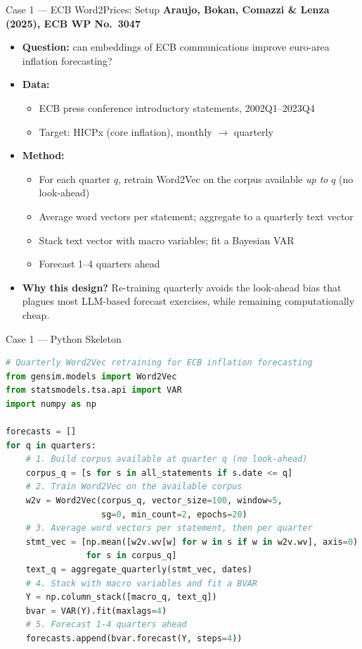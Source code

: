\documentclass[10pt,english,aspectratio=169]{beamer}
\begin{document}
\begin{frame}{Case 1 --- ECB Word2Prices: Setup}
\textbf{Araujo, Bokan, Comazzi \& Lenza (2025), ECB WP No.\ 3047}

\medskip
\begin{itemize}
\item \textbf{Question:} can embeddings of ECB communications improve euro-area inflation forecasting?

\medskip
\item \textbf{Data:}
\begin{itemize}
    \item ECB press conference introductory statements, 2002Q1--2023Q4
    \item Target: HICPx (core inflation), monthly $\rightarrow$ quarterly
\end{itemize}

\medskip
\item \textbf{Method:}
\begin{itemize}
    \item For each quarter $q$, retrain Word2Vec on the corpus available \emph{up to} $q$ (no look-ahead)
    \item Average word vectors per statement; aggregate to a quarterly text vector
    \item Stack text vector with macro variables; fit a Bayesian VAR
    \item Forecast 1--4 quarters ahead
\end{itemize}

\medskip
\item \textbf{Why this design?} Re-training quarterly avoids the look-ahead bias that plagues most LLM-based forecast exercises, while remaining computationally cheap.
\end{itemize}
\end{frame}

\begin{frame}[fragile]{Case 1 --- Python Skeleton}
\begin{lstlisting}[language=Python, basicstyle=\scriptsize\ttfamily]
# Quarterly Word2Vec retraining for ECB inflation forecasting
from gensim.models import Word2Vec
from statsmodels.tsa.api import VAR
import numpy as np

forecasts = []
for q in quarters:
    # 1. Build corpus available at quarter q (no look-ahead)
    corpus_q = [s for s in all_statements if s.date <= q]
    # 2. Train Word2Vec on the available corpus
    w2v = Word2Vec(corpus_q, vector_size=100, window=5,
                   sg=0, min_count=2, epochs=20)
    # 3. Average word vectors per statement, then per quarter
    stmt_vec = [np.mean([w2v.wv[w] for w in s if w in w2v.wv], axis=0)
                for s in corpus_q]
    text_q = aggregate_quarterly(stmt_vec, dates)
    # 4. Stack with macro variables and fit a BVAR
    Y = np.column_stack([macro_q, text_q])
    bvar = VAR(Y).fit(maxlags=4)
    # 5. Forecast 1-4 quarters ahead
    forecasts.append(bvar.forecast(Y, steps=4))
\end{lstlisting}
\end{frame}
\end{document}
